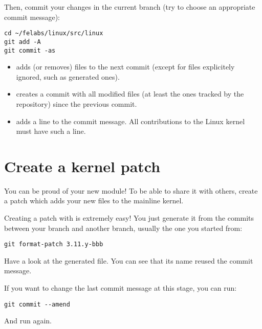 Then, commit your changes in the current branch (try to choose an
appropriate commit message):

\begin{verbatim}
cd ~/felabs/linux/src/linux
git add -A
git commit -as
\end{verbatim}

\begin{itemize}
\item {} adds (or removes) files to the next commit
      (except for files explicitely ignored, such as generated ones).
\item {} creates a commit with all modified files
      (at least the ones tracked by the repository) since the previous
      commit.
\item {} adds a  line to the
      commit message. All contributions to the Linux kernel must have
      such a line.
\end{itemize}

\section{Create a kernel patch}

You can be proud of your new module! To be able to share it with
others, create a patch which adds your new files to the mainline
kernel.

Creating a patch with  is extremely easy! You just generate it
from the commits between your branch and another branch, usually the
one you started from:

\begin{verbatim}
git format-patch 3.11.y-bbb
\end{verbatim}

Have a look at the generated file. You can see that its name reused
the commit message.

If you want to change the last commit message at this stage, you 
can run:

\begin{verbatim}
git commit --amend
\end{verbatim}

And run  again.
